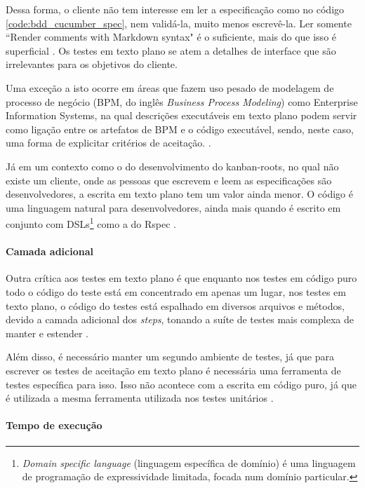 Dessa forma, o cliente não tem interesse em ler a especificação como no código \ref{code:bdd_cucumber_spec}, nem validá-la, muito menos escrevê-la. Ler somente ``Render comments with Markdown syntax" é o suficiente, mais do que isso é superficial \cite{WhyBotherWithCucumberTesting}. Os testes em texto plano se atem a detalhes de interface que são irrelevantes para os objetivos do cliente.

Uma exceção a isto ocorre em áreas que fazem uso pesado de modelagem de processo de negócio (BPM, do inglês \textit{Business Process Modeling})  como Enterprise Information Systems, na qual descrições executáveis em texto plano podem servir como ligação entre os artefatos de BPM e o código executável, sendo, neste caso, uma forma de explicitar critérios de aceitação. \cite{IntroducingBLDD}.

Já em um contexto como o do desenvolvimento do kanban-roots, no qual não existe um cliente, onde as pessoas que escrevem e leem as especificações são desenvolvedores, a escrita em texto plano tem um valor ainda menor. O código é uma linguagem natural para desenvolvedores, ainda mais quando é escrito em conjunto com DSLs\footnote{\textit{Domain specific language} (linguagem específica de domínio) é uma linguagem de programação de expressividade limitada, focada num domínio particular.}  como a do Rspec \cite{SteakOverCucumber}.


\paragraph{Camada adicional}
\label{sssub:camada_adicional}

Outra crítica aos testes em texto plano é que enquanto nos testes em código puro todo o código do teste está em concentrado em apenas um lugar, nos testes em texto plano, o código do testes está espalhado em diversos arquivos e métodos, devido a camada adicional dos \textit{steps}, tonando a suíte de testes mais complexa de manter e estender \cite{SteakOverCucumber}.

Além disso, é necessário manter um segundo ambiente de testes, já que para escrever os testes de aceitação em texto plano é necessária uma ferramenta de testes específica para isso. Isso não acontece com a escrita em código puro, já que é utilizada a mesma ferramenta utilizada nos testes unitários \cite{WhyBotherWithCucumberTesting}.


\paragraph{Tempo de execução}
\label{sssub:tempo_de_execucao}

